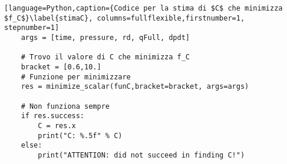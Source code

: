 \begin{lstlisting}[language=Python,caption={Codice per la stima di $C$ che minimizza $f_C$}\label{stimaC}, columns=fullflexible,firstnumber=1, stepnumber=1]
    args = [time, pressure, rd, qFull, dpdt]
    
    # Trovo il valore di C che minimizza f_C
    bracket = [0.6,10.]
    # Funzione per minimizzare
    res = minimize_scalar(funC,bracket=bracket, args=args)
    
    # Non funziona sempre
    if res.success:
        C = res.x
        print("C: %.5f" % C)
    else:
        print("ATTENTION: did not succeed in finding C!")
\end{lstlisting}